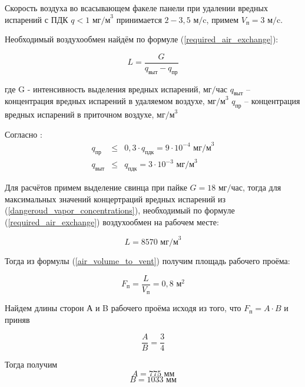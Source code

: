 Скорость воздуха во всасывающем факеле панели при удалении вредных испарений с
ПДК $q < 1$ $\text{мг/м}^3$ \cite[табл. 1.1]{local_vent_spot_calc_method} принимается
$2 - 3,5 \text{ м/c}$, примем $V_\text{п} = 3 \text{ м/c}$.

Необходимый воздухообмен найдём по формуле (\ref{required_air_exchange}):

\begin{equation}
\label{required_air_exchange}
    L = \frac{G}{q_\text{выт} - q_\text{пр}}
\end{equation}

где G - интенсивность выделения вредных испарений, $\text{мг/час}$
$q_\text{выт}$ – концентрация вредных испарений в удаляемом воздухе, $\text{мг/м}^3$
$q_\text{пр}$ – концентрация вредных испарений в приточном воздухе, $\text{мг/м}^3$

Согласно \cite[п. 2.15]{ecology_san_norm_245_71}:
\begin{equation}
\label{dangeroud_vapor_concentrations}
    \begin{array}{lcr}
        q_\text{пр}  & \leq & 0,3 \cdot q_\text{пдк} = 9 \cdot 10^{-4} \text{ мг/м}^3 \\
        q_\text{выт} & \leq &           q_\text{пдк} = 3 \cdot 10^{-3} \text{ мг/м}^3
    \end{array}
\end{equation}

Для расчётов примем выделение свинца при пайке $G = 18 \text{ мг/час}$,
тогда для максимальных значений концертраций вредных испарений из
(\ref{dangeroud_vapor_concentrations}), необходимый по формуле (\ref{required_air_exchange})
воздухообмен на рабочем месте:

$$
    L = 8570 \text{ мг/м}^3
$$

Тогда из формулы (\ref{air_volume_to_vent}) получим площадь рабочего проёма:

\begin{equation}
\label{working_window_area}
    F_\text{п} = \frac{L}{V_\text{п}} = 0,8 \text{ м}^2
\end{equation}

Найдем длины сторон А и B рабочего проёма исходя из того, что $F_\text{п}  = A \cdot B$ и приняв

\begin{equation}
\label{working_window_area_sides_ratio}
    \frac{A}{B} = \frac{3}{4}
\end{equation}

Тогда получим
$$
    A = 775 \text{ мм}
$$
$$
    B = 1033 \text{ мм}
$$


